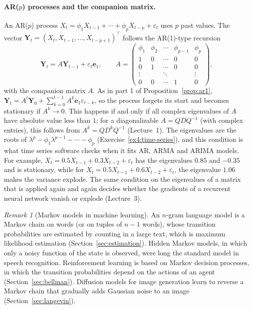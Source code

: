 \documentclass[11pt]{article}
\theoremstyle{definition}
\theoremstyle{plain}
\theoremstyle{remark}
\newtheorem{remark}[definition]{Remark}
\begin{document}
\paragraph{AR($p$) processes and the companion matrix.} An AR($p$) process $X_t = \phi_1X_{t-1} + \cdots + \phi_pX_{t-p} + \varepsilon_t$ uses $p$ past values. The vector $\mathbf{Y}_t = (X_t, X_{t-1}, \ldots, X_{t-p+1})^\top$ follows the AR(1)-type recursion
\[\mathbf{Y}_t = A\mathbf{Y}_{t-1} + \varepsilon_t\mathbf{e}_1, \qquad A = \begin{pmatrix} \phi_1 & \phi_2 & \cdots & \phi_{p-1} & \phi_p \\ 1 & 0 & \cdots & 0 & 0 \\ 0 & 1 & \cdots & 0 & 0 \\ \vdots & & \ddots & & \vdots \\ 0 & 0 & \cdots & 1 & 0 \end{pmatrix},\]
with the companion matrix $A$. As in part 1 of Proposition~\ref{prop:ar1}, $\mathbf{Y}_t = A^t\mathbf{Y}_0 + \sum_{k=0}^{t-1}A^k\mathbf{e}_1\varepsilon_{t-k}$, so the process forgets its start and becomes stationary if $A^k \to 0$. This happens if and only if all complex eigenvalues of $A$ have absolute value less than $1$; for a diagonalizable $A = QDQ^{-1}$ (with complex entries), this follows from $A^k = QD^kQ^{-1}$ (Lecture~1). The eigenvalues are the roots of $\lambda^p - \phi_1\lambda^{p-1} - \cdots - \phi_p$ (Exercise~\ref{ex4:time-series}), and this condition is what time series software checks when it fits AR, ARMA and ARIMA models. For example, $X_t = 0.5X_{t-1} + 0.3X_{t-2} + \varepsilon_t$ has the eigenvalues $0.85$ and $-0.35$ and is stationary, while for $X_t = 0.5X_{t-1} + 0.6X_{t-2} + \varepsilon_t$, the eigenvalue $1.06$ makes the variance explode. The same condition on the eigenvalues of a matrix that is applied again and again decides whether the gradients of a recurrent neural network vanish or explode (Lecture~3).

\begin{remark}[Markov models in machine learning]
    An $n$-gram language model is a Markov chain on words (or on tuples of $n - 1$ words), whose transition probabilities are estimated by counting in a large text, which is maximum likelihood estimation (Section~\ref{sec:estimation}). Hidden Markov models, in which only a noisy function of the state is observed, were long the standard model in speech recognition. Reinforcement learning is based on Markov decision processes, in which the transition probabilities depend on the actions of an agent (Section~\ref{sec:bellman}). Diffusion models for image generation learn to reverse a Markov chain that gradually adds Gaussian noise to an image (Section~\ref{sec:langevin}).
\end{remark}
\end{document}
